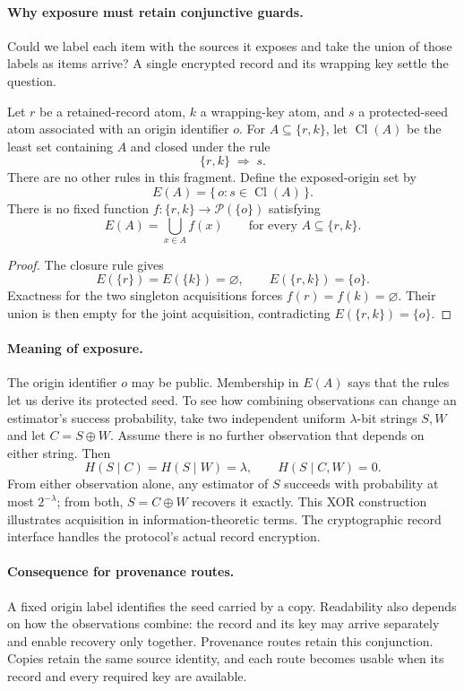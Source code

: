 \paragraph{Why exposure must retain conjunctive guards.}
Could we label each item with the sources it exposes and take the
union of those labels as items arrive? A single encrypted record and
its wrapping key settle the question.

\begin{proposition}
\label{prop:acquisition-nonadditivity}
Let $r$ be a retained-record atom, $k$ a wrapping-key atom, and $s$ a
protected-seed atom associated with an origin identifier $o$.
For $A\subseteq\{r,k\}$, let $\operatorname{Cl}(A)$ be the least set
containing $A$ and closed under the rule
\[
  \{r,k\}\;\Longrightarrow\;s.
\]
There are no other rules in this fragment.  Define the exposed-origin set by
\[
  E(A)=\{\,o : s\in\operatorname{Cl}(A)\,\}.
\]
There is no fixed function
$f:\{r,k\}\longrightarrow\mathcal{P}(\{o\})$ satisfying
\[
  E(A)=\bigcup_{x\in A} f(x)
  \qquad\text{for every }A\subseteq\{r,k\}.
\]
\end{proposition}

\begin{proof}
The closure rule gives
\[
  E(\{r\})=E(\{k\})=\varnothing,
  \qquad
  E(\{r,k\})=\{o\}.
\]
Exactness for the two singleton acquisitions forces
$f(r)=f(k)=\varnothing$.  Their union is then empty for the joint
acquisition, contradicting $E(\{r,k\})=\{o\}$.
\end{proof}

\paragraph{Meaning of exposure.}
The origin identifier $o$ may be public. Membership in $E(A)$ says that
the rules let us derive its protected seed. To see how combining
observations can change an estimator's success probability, take two
independent uniform $\lambda$-bit strings $S,W$ and let
$C=S\mathbin{\oplus}W$. Assume there is no further observation that
depends on either string. Then
\[
  H(S\mid C)=H(S\mid W)=\lambda,
  \qquad H(S\mid C,W)=0.
\]
From either observation alone, any estimator of $S$ succeeds with
probability at most $2^{-\lambda}$; from both, $S=C\mathbin{\oplus}W$
recovers it exactly. This XOR construction illustrates acquisition in
information-theoretic terms. The cryptographic record interface handles
the protocol's actual record encryption.

\paragraph{Consequence for provenance routes.}
A fixed origin label identifies the seed carried by a copy. Readability
also depends on how the observations combine: the record and its key
may arrive separately and enable recovery only together. Provenance
routes retain this conjunction. Copies retain the same source identity,
and each route becomes usable when its record and every required key
are available.
